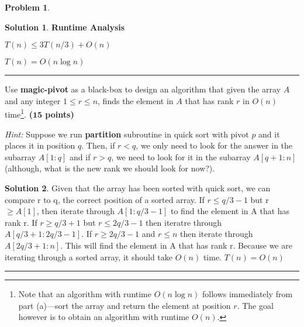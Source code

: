 \documentclass{article}
\theoremstyle{definition}
\newtheorem{problem}{Problem}
\def\fline{\rule{0.75\linewidth}{0.5pt}}
\newcommand{\finishline}{\begin{center}\fline\end{center}}
\newtheorem*{solution*}{Solution}
\newenvironment{solution}{\begin{solution*}}{{\finishline} \end{solution*}}
\newcommand{\grade}[1]{\hfill{\textbf{($\mathbf{#1}$ points)}}}
\begin{document}
\begin{problem}
\begin{enumerate}
\begin{solution}
		\item \textbf{Runtime Analysis}
		\item $T(n) \leq 3T(n/3) + O(n)$
		\item $T(n) = O(n \log n)$
	\end{solution}
	
	\item[(b)] Use \textbf{magic-pivot} as a black-box to design an algorithm that given the array $A$ and any integer $1 \leq r \leq n$, finds the element in $A$ that has rank $r$ in $O(n)$ time\footnote{Note that an algorithm with runtime $O(n\log{n})$ follows immediately from part (a)---sort the array and return the element at position $r$. The goal however is to obtain an algorithm with runtime $O(n)$.}. \grade{15}
	
	\emph{Hint:} Suppose we run \textbf{partition} subroutine in quick sort with pivot $p$ and it places it in position $q$. Then, if $r < q$, we only need to look for the answer in the subarray $A[1:q]$ and 
	if $r > q$, we need to look for it in the subarray $A[q+1:n]$ (although, what is the new rank we should look for now?). 


	\begin{solution}
		\item Given that the array has been sorted with quick sort, we can compare r to q, the correct position of a sorted array. If $ r \leq q/3 - 1$ but r$ \geq A[1]$, then iterate through $A[1 : q/3 - 1]$ to find the element in A that has rank r.  If $r \geq q/3 + 1$ but $r \leq 2q/3 -1$ then iteratre through $A[q/3 +1 : 2q/3 - 1]$. If $r \geq 2q/3 - 1$ and $r \leq n$ then iterate through $A[2q/3 + 1 : n]$. This will find the element in A that has rank r. Because we are iterating through a sorted array, it should take $O(n)$ time. $T(n) = O(n)$
	\end{solution}

	\end{enumerate}
	
\end{problem}
\end{document}
